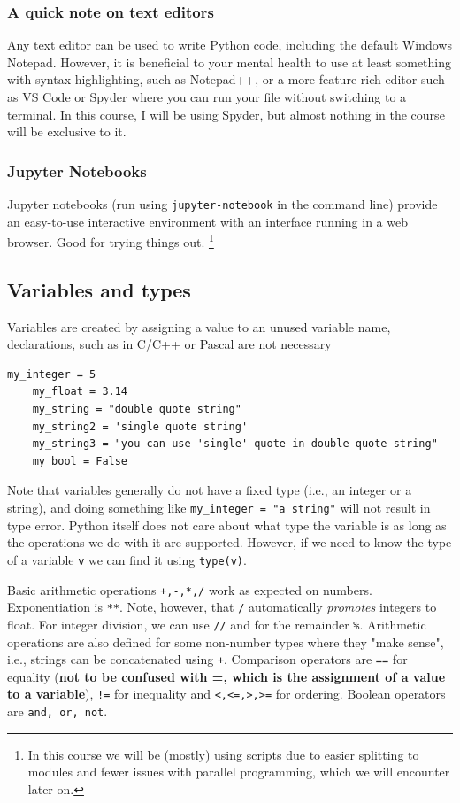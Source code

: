 \documentclass{article}
\newcounter{syntax}
\begin{document}
\subsubsection{A quick note on text editors}
Any text editor can be used to write Python code, including the default Windows Notepad. However, it is beneficial to your mental health to use at least something with syntax highlighting, such as Notepad++, or a more feature-rich editor such as VS Code or Spyder where you can run your file without switching to a terminal. In this course, I will be using Spyder, but almost nothing in the course will be exclusive to it.

\subsubsection{Jupyter Notebooks}
Jupyter notebooks (run using \verb|jupyter-notebook| in the command line) provide an easy-to-use interactive environment with an interface running in a web browser. Good for trying things out. \footnote{In this course we will be (mostly) using scripts due to easier splitting to modules and fewer issues with parallel programming, which we will encounter later on.}

\subsection{Variables and types}

Variables are created by assigning a value to an unused variable name, declarations, such as in C/C++ or Pascal are not necessary
\begin{lstlisting}[caption=Defining variables]
    my_integer = 5
    my_float = 3.14
    my_string = "double quote string"
    my_string2 = 'single quote string'
    my_string3 = "you can use 'single' quote in double quote string"
    my_bool = False
\end{lstlisting}

Note that variables generally do not have a fixed type (i.e., an integer or a string), and doing something like \lstinline{my_integer = "a string"} will not result in type error. Python itself does not care about what type the variable is as long as the operations we do with it are supported. However, if we need to know the type of a variable \lstinline{v} we can find it using \lstinline{type(v)}.

Basic arithmetic operations \verb|+,-,*,/| work as expected on numbers. Exponentiation is \verb|**|. Note, however, that \verb|/| automatically \emph{promotes} integers to float. For integer division, we can use \verb|//| and for the remainder \verb|%|. Arithmetic operations are also defined for some non-number types where they "make sense", i.e., strings can be concatenated using \verb|+|. Comparison operators are \verb|==| for equality (\textbf{not to be confused with =, which is the assignment of a value to a variable}), \verb|!=| for inequality and \verb|<,<=,>,>=| for ordering. Boolean operators are \verb|and, or, not|. 
\end{document}
